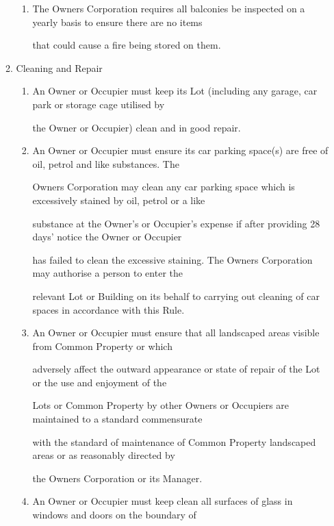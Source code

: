 \documentclass{article}
\begin{document}
\begin{enumerate}[label=\arabic*.]
\begin{enumerate}[label=\arabic{enumi}.\arabic*.]
\begin{enumerate}[label=(\arabic*)]
\item {\fontsize{9.962}{1} The Owners Corporation requires all balconies be inspected on a yearly basis to ensure there are no items }

{\fontsize{10.02}{1}that could cause a fire being stored on them. }

\end{enumerate}
\item {\fontsize{9.99}{1} Cleaning and Repair }

\begin{enumerate}[label=(\arabic*)]
\item {\fontsize{9.962}{1} An Owner or Occupier must keep its Lot (including any garage, car park or storage cage utilised by }

{\fontsize{10.02}{1}the Owner or Occupier) clean and in good repair. }

\item {\fontsize{9.962}{1} An Owner or Occupier must ensure its car parking space(s) are free of oil, petrol and like substances. The }

{\fontsize{10.02}{1}Owners Corporation may clean any car parking space which is excessively stained by oil, petrol or a like }

{\fontsize{10.02}{1}substance at the Owner's or Occupier's expense if after providing 28 days’ notice the Owner or Occupier }

{\fontsize{10.02}{1}has failed to clean the excessive staining. The Owners Corporation may authorise a person to enter the }

{\fontsize{10.02}{1}relevant Lot or Building on its behalf to carrying out cleaning of car spaces in accordance with this Rule. }

\item {\fontsize{9.962}{1} An Owner or Occupier must ensure that all landscaped areas visible from Common Property or which }

{\fontsize{10.02}{1}adversely affect the outward appearance or state of repair of the Lot or the use and enjoyment of the }

{\fontsize{10.02}{1}Lots or Common Property by other Owners or Occupiers are maintained to a standard commensurate }

{\fontsize{10.02}{1}with the standard of maintenance of Common Property landscaped areas or as reasonably directed by }

{\fontsize{10.02}{1}the Owners Corporation or its Manager. }

\item {\fontsize{9.962}{1} An Owner or Occupier must keep clean all surfaces of glass in windows and doors on the boundary of }


\end{enumerate}
\end{enumerate}
\end{enumerate}
\end{document}
